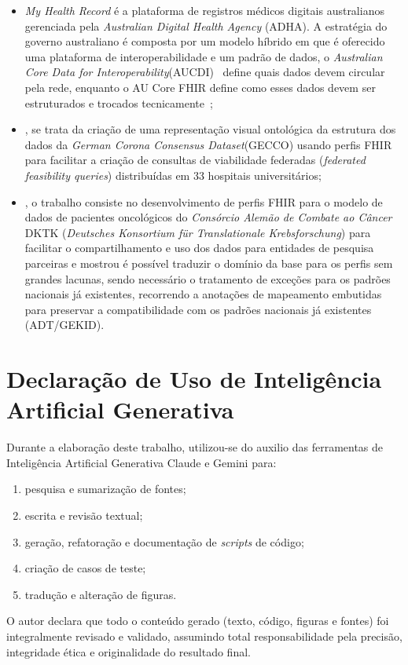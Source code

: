 \begin{itemize}
  \item \textit{My Health Record} é a plataforma de registros médicos digitais australianos gerenciada pela \textit{Australian Digital Health Agency} (ADHA). A estratégia do governo australiano é composta por um modelo híbrido em que é oferecido uma plataforma de interoperabilidade e um padrão de dados, o \textit{Australian Core Data for Interoperability}(AUCDI)~\cite{AustralianCoreDataforInteroperability} define quais dados devem circular pela rede, enquanto o AU Core FHIR \cite{AUCoreFHIR} define como esses dados devem ser estruturados e trocados tecnicamente~\cite{MyHealthRecord};
  \item {}, se trata da criação de uma representação visual ontológica da estrutura dos dados da \textit{German Corona Consensus Dataset}(GECCO) usando perfis FHIR para facilitar a criação de consultas de viabilidade federadas (\textit{federated feasibility queries}) distribuídas em 33 hospitais universitários;
  \item {}, o trabalho consiste no desenvolvimento de perfis FHIR para o modelo de dados de pacientes oncológicos do \textit{Consórcio Alemão de Combate ao Câncer} DKTK (\textit{Deutsches Konsortium für Translationale Krebsforschung}) para facilitar o compartilhamento e uso dos dados para entidades de pesquisa parceiras e mostrou é possível traduzir o domínio da base para os perfis sem grandes lacunas, sendo necessário o tratamento de exceções para os padrões nacionais já existentes, recorrendo a anotações de mapeamento embutidas para preservar a compatibilidade com os padrões nacionais já existentes (ADT/GEKID).
\end{itemize} 

\section{ Declaração de Uso de Inteligência Artificial Generativa}\label{sec:declaracaoIA}

Durante a elaboração deste trabalho, utilizou-se do auxilio das ferramentas de Inteligência Artificial Generativa Claude e Gemini para: 

\begin{enumerate}[label=(\roman*)]
    \item pesquisa e sumarização de fontes; 
    \item escrita e revisão textual;
    \item geração, refatoração e documentação de \textit{scripts} de código;
    \item criação de casos de teste;
    \item tradução e alteração de figuras.
\end{enumerate}
    
O autor declara que todo o conteúdo gerado (texto, código, figuras e fontes) foi integralmente revisado e validado, assumindo total responsabilidade pela precisão, integridade ética e originalidade do resultado final.
